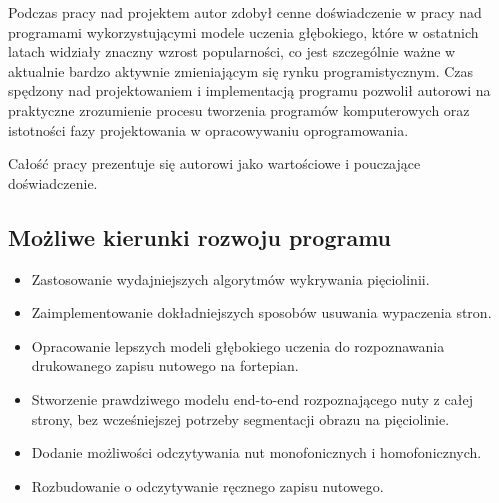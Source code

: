 \documentclass[xodstep]{wnspt}
\begin{document}
Podczas pracy nad projektem autor zdobył cenne doświadczenie w pracy nad programami wykorzystującymi modele uczenia głębokiego, które w ostatnich latach widziały znaczny wzrost popularności, co jest szczególnie ważne w aktualnie bardzo aktywnie zmieniającym się rynku programistycznym. Czas spędzony nad projektowaniem i implementacją programu pozwolił autorowi na praktyczne zrozumienie procesu tworzenia programów komputerowych oraz istotności fazy projektowania w opracowywaniu oprogramowania.

Całość pracy prezentuje się autorowi jako wartościowe i pouczające doświadczenie.

\vspace{5mm}

\subsection*{Możliwe kierunki rozwoju programu}

\begin{itemize}
	\item Zastosowanie wydajniejszych algorytmów wykrywania pięciolinii.
	\item Zaimplementowanie dokładniejszych sposobów usuwania wypaczenia stron.
	\item Opracowanie lepszych modeli głębokiego uczenia do rozpoznawania drukowanego zapisu nutowego na fortepian.
	\item Stworzenie prawdziwego modelu end-to-end rozpoznającego nuty z całej strony, bez wcześniejszej potrzeby segmentacji obrazu na pięciolinie.
	\item Dodanie możliwości odczytywania nut monofonicznych i homofonicznych.
	\item Rozbudowanie o odczytywanie ręcznego zapisu nutowego.
\end{itemize}

\nocite{*}
\printbibheading
\printbibliography[type=book, heading=subbibliography, title={Książki}]
\printbibliography[type=article, heading=subbibliography, title={Artykuły}]
\printbibliography[type=inproceedings, heading=subbibliography, title={Materiały konferencyjne}]
\printbibliography[type=online, heading=subbibliography, title={Strony internetowe}]

\listoftables

\listoffigures

\lstlistoflistings
\end{document}
